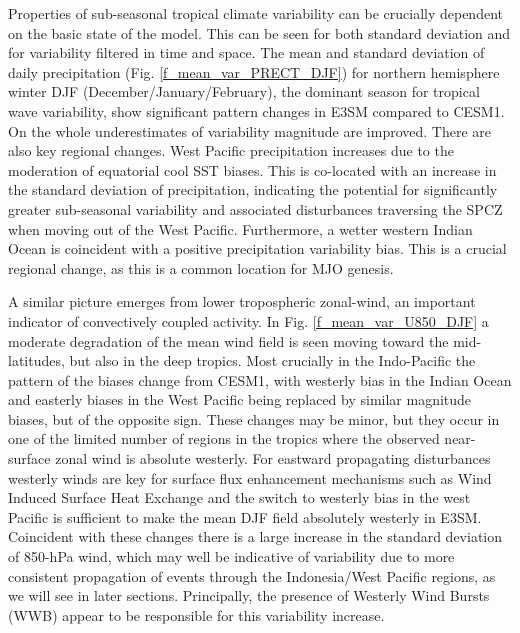 \documentclass[draft,ms]{AGUTeX}
\begin{document}
\begin{article}
Properties of sub-seasonal tropical climate variability can be crucially dependent on the basic state of the model. This can be seen for both standard deviation and for variability filtered in time and space. The mean and standard deviation of daily precipitation (Fig. \ref{f_mean_var_PRECT_DJF}) for northern hemisphere winter DJF (December/January/February), the dominant season for tropical wave variability, show significant pattern changes in E3SM compared to CESM1. On the whole underestimates of variability magnitude are improved. There are also key regional changes. West Pacific precipitation increases due to the moderation of equatorial cool SST biases. This is co-located with an increase in the standard deviation of precipitation, indicating the potential for significantly greater sub-seasonal variability and associated disturbances traversing the SPCZ when moving out of the West Pacific. Furthermore, a wetter western Indian Ocean is coincident with a positive precipitation variability bias. This is a crucial regional change, as this is a common location for MJO genesis. 

A similar picture emerges from lower tropospheric zonal-wind, an important indicator of convectively coupled activity. In Fig. \ref{f_mean_var_U850_DJF} a moderate degradation of the mean wind field is seen moving toward the mid-latitudes, but also in the deep tropics. Most crucially in the Indo-Pacific the pattern of the biases change from CESM1, with westerly bias in the Indian Ocean and easterly biases in the West Pacific being replaced by similar magnitude biases, but of the opposite sign. These changes may be minor, but they occur in one of the limited number of regions in the tropics where the observed near-surface zonal wind is absolute westerly. For eastward propagating disturbances westerly winds are key for surface flux enhancement mechanisms such as Wind Induced Surface Heat Exchange \cite[WISHE,][]{Neelin1987,Emanuel1987} and the switch to westerly bias in the west Pacific is sufficient to make the mean DJF field absolutely westerly in E3SM. Coincident with these changes there is a large increase in the standard deviation of 850-hPa wind, which may well be indicative of variability due to more consistent propagation of events through the Indonesia/West Pacific regions, as we will see in later sections. Principally, the presence of Westerly Wind Bursts (WWB) appear to be responsible for this variability increase.


\end{article}
\end{document}
